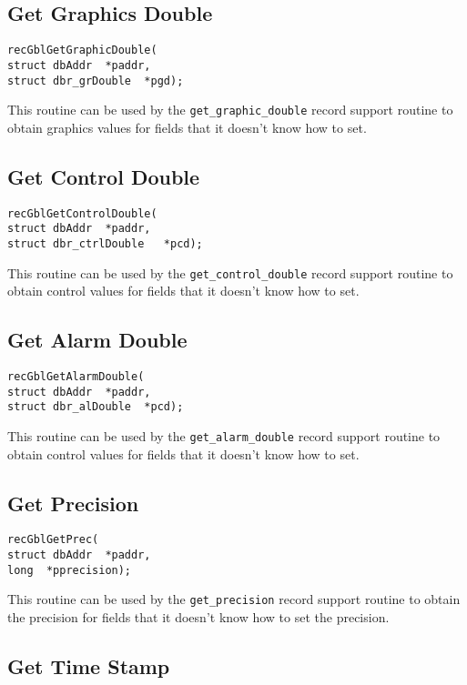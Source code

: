 \subsection{Get Graphics Double}

\begin{verbatim}recGblGetGraphicDouble(
struct dbAddr  *paddr,
struct dbr_grDouble  *pgd);
\end{verbatim}This routine can be used by the \verb|get_graphic_double| record support routine to obtain graphics values for fields that 
it doesn't know how to set.

\subsection{Get Control Double}

\begin{verbatim}recGblGetControlDouble(
struct dbAddr  *paddr,
struct dbr_ctrlDouble   *pcd);
\end{verbatim}This routine can be used by the \verb|get_control_double| record support routine to obtain control values for fields that it 
doesn't know how to set.

\subsection{Get Alarm Double}

\begin{verbatim}recGblGetAlarmDouble(
struct dbAddr  *paddr,
struct dbr_alDouble  *pcd);
\end{verbatim}This routine can be used by the \verb|get_alarm_double| record support routine to obtain control values for fields that it 
doesn't know how to set.

\subsection{Get Precision}

\begin{verbatim}recGblGetPrec(
struct dbAddr  *paddr,
long  *pprecision);
\end{verbatim}This routine can be used by the \verb|get_precision| record support routine to obtain the precision for fields that it doesn't 
know how to set the precision.

\subsection{Get Time Stamp}

